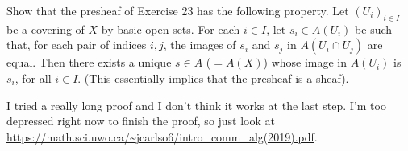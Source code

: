 \begin{questions}
\question Show that the presheaf of Exercise 23 has the following property. Let $(U_i)_{i\in I} $ be a covering of $X $ by basic open sets. For each $i\in I $, let $s_i \in A(U_i) $ be such that, for each pair of indices $i,j $, the images of $s_i $ and $s_j $ in $A(U_i \cap U_j) $ are equal. Then there exists a unique $s\in A $ ($= A(X) $) whose image in $A(U_i) $ is $s_i $, for all $i\in I $. (This essentially implies that the presheaf is a sheaf).
\begin{solution}
	I tried a really long proof and I don't think it works at the last step.
	I'm too depressed right now to finish the proof, so just look at \url{https://math.sci.uwo.ca/~jcarlso6/intro_comm_alg(2019).pdf}.

\end{solution}
\end{questions}
